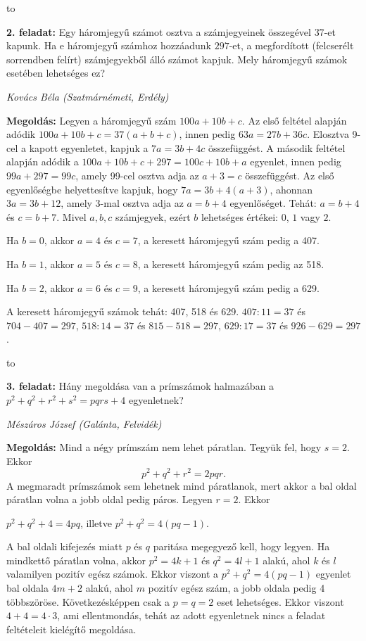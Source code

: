 \documentclass[a4paper,10pt]{article}
\newcommand{\ki}[2]{\hfill {\it #1 (#2)}\medskip}
\newcommand{\vonal}{\hbox to \hsize{\hskip2truecm\hrulefill\hskip2truecm}}
\begin{document}
\vonal

{\bf 2. feladat: } Egy háromjegyű számot osztva a számjegyeinek összegével $37$-et kapunk. Ha e
háromjegyű számhoz hozzáadunk $297$-et, a megfordított (felcserélt sorrendben
felírt) számjegyek\-ből álló számot kapjuk. Mely háromjegyű számok esetében
lehetséges ez?

\ki{Kovács Béla}{Szatmárnémeti, Erdély}\medskip

{\bf Megoldás: } Legyen a háromjegyű szám $100a+10b+c$. Az első feltétel alapján adódik $100a+10b+c=37(a+b+c)$, innen pedig $63a=27b+36c$. Elosztva 9-cel a kapott egyenletet, kapjuk a $7a=3b+4c$ összefüggést. A második feltétel alapján adódik a $100a+10b+c+297=100c+10b+a$ egyenlet, innen pedig $99a+297=99c$, amely 99-cel osztva adja az $a+3=c$ összefüggést. Az első egyenlőségbe helyettesítve kapjuk, hogy $7a=3b+4(a+3)$, ahonnan $3a=3b+12$, amely 3-mal osztva adja az $a=b+4$  egyenlőséget. Tehát: $a=b+4$ és $c=b+7$. Mivel $a, b, c$  számjegyek, ezért $b$ lehetséges értékei: $0$, $1$ vagy $2$.
 
Ha $b=0$, akkor $a=4$ és $c=7$, a keresett háromjegyű szám pedig a 407.

Ha $b=1$, akkor $a=5$ és $c=8$, a keresett háromjegyű szám pedig az 518.

Ha $b=2$, akkor $a=6$ és $c=9$, a keresett háromjegyű szám pedig a 629.

\noindent
A keresett háromjegyű számok tehát: 407, 518 és 629.
$407:11=37$ és $704-407=297$, 
$518:14=37$ és $815-518=297$,
$629:17=37$ és $926-629=297$.

\vonal

{\bf 3. feladat: } Hány megoldása van a prímszámok halmazában a
$p^2 + q^2 + r^2 + s^2 = pqrs + 4$
egyenletnek?

\ki{Mészáros József}{Galánta, Felvidék}\medskip

{\bf Megoldás: } Mind a négy prímszám nem lehet páratlan. Tegyük fel, hogy $s=2$. Ekkor
$$p^2+q^2+r^2=2pqr.$$
A megmaradt prímszámok sem lehetnek mind páratlanok, mert akkor a bal oldal páratlan volna a jobb oldal pedig páros. Legyen $r=2$. Ekkor \\
\centerline{$p^2+q^2+4=4pq$,   illetve  $p^2+q^2=4(pq-1)$.\\}
A bal oldali kifejezés miatt $p$ és $q$ paritása megegyező kell, hogy legyen. Ha mindkettő páratlan volna, akkor $p^2=4k+1$ és $q^2=4l+1$ alakú, ahol $k$ és $l$ valamilyen pozitív egész számok. Ekkor viszont a $p^2+q^2=4(pq-1)$ egyenlet bal oldala $4m+2$ alakú, ahol $m$ pozitív egész szám, a jobb oldala pedig 4 többszöröse. Következésképpen csak a  $p=q=2$ eset lehetséges. Ekkor viszont $4+4=4\cdot 3$, ami ellentmondás, tehát az adott egyenletnek nincs a feladat feltételeit kielégítő megoldása.
\end{document}
